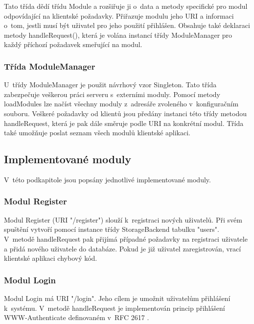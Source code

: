 Tato třída dědí třídu Module a rozšiřuje ji o~data a metody specifické pro modul odpovídající na klientské požadavky.
Přiřazuje modulu jeho URI a informaci o~tom, jestli musí být uživatel pro jeho použití přihlášen.
Obsahuje také deklaraci metody handleRequest(), která je volána instancí třídy ModuleManager pro každý příchozí požadavek
smeřující na modul.

\subsubsection{Třída ModuleManager}

U~třídy ModuleManager je použit návrhový vzor Singleton.
Tato třída zabezpečuje veškerou práci serveru s~externími moduly. Pomocí 
metody loadModules lze načíst všechny moduly z~adresáře zvoleného v~konfiguračním souboru. Veškeré požadavky od klientů
jsou předány instanci této třídy metodou handleRequest, která je pak dále směruje podle URI na konkrétní modul. Třída také
umožňuje poslat seznam všech modulů klientské aplikaci.

\subsection{Implementované moduly} %
\label{implementovane_moduly}

V~této podkapitole jsou popsány jednotlivé implementované moduly.

\subsubsection{Modul Register}

Modul Register (URI "/register") %
slouží k~registraci nových uživatelů. Při svém spuštění vytvoří pomocí
instance třídy StorageBackend tabulku "users". V~metodě handleRequest pak přijímá případné požadavky na registraci
uživatele a přidá nového uživatele do databáze. Pokud je již uživatel zaregistrován, vrací klientské aplikaci chybový kód.

\subsubsection{Modul Login}

Modul Login má URI "/login". Jeho cílem je umožnit uživatelům přihlášení k~systému. V~metodě handleRequest je
implementován princip přihlášení WWW-Authenticate definovaném v~RFC 2617 \cite{rfc2617}. %

